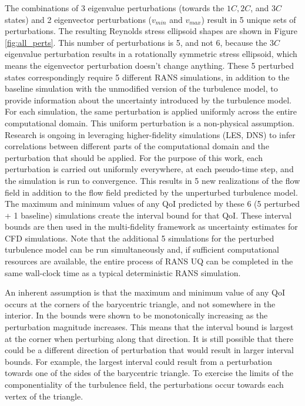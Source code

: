 The combinations of 3 eigenvalue perturbations (towards the $1C, 2C$, and $3C$ states) and 2 eigenvector perturbations ($v_{min}$ and $v_{max}$) result in 5 unique sets of perturbations. The resulting Reynolds stress ellipsoid shapes are shown in Figure \ref{fig:all_perts}. This number of perturbations is 5, and not 6, because the $3C$ eigenvalue perturbation results in a rotationally symmetric stress ellipsoid, which means the eigenvector perturbation doesn't change anything. These 5 perturbed states correspondingly require 5 different RANS simulations, in addition to the baseline simulation with the unmodified version of the turbulence model, to provide information about the uncertainty introduced by the turbulence model. For each simulation, the same perturbation is applied uniformly across the entire computational domain. This uniform perturbation is a non-physical assumption. Research is ongoing in leveraging higher-fidelity simulations (LES, DNS) to infer correlations between different parts of the computational domain and the perturbation that should be applied. For the purpose of this work, each perturbation is carried out uniformly everywhere, at each pseudo-time step, and the simulation is run to convergence. This results in 5 new realizations of the flow field in addition to the flow field predicted by the unperturbed turbulence model. The maximum and minimum values of any QoI predicted by these 6 (5 perturbed + 1 baseline) simulations create the interval bound for that QoI. These interval bounds are then used in the multi-fidelity framework as uncertainty estimates for CFD simulations. Note that the additional 5 simulations for the perturbed turbulence model can be run simultaneously and, if sufficient computational resources are available, the entire process of RANS UQ can be completed in the same wall-clock time as a typical deterministic RANS simulation.

An inherent assumption is that the maximum and minimum value of any QoI occurs at the corners of the barycentric triangle, and not somewhere in the interior. In \cite{emory2014visualizing} the bounds were shown to be monotonically increasing as the perturbation magnitude increases. This means that the interval bound is largest at the corner when perturbing along that direction. It is still possible that there could be a different direction of perturbation that would result in larger interval bounds. For example, the largest interval could result from a perturbation towards one of the sides of the barycentric triangle. To exercise the limits of the componentiality of the turbulence field, the perturbations occur towards each vertex of the triangle. 


